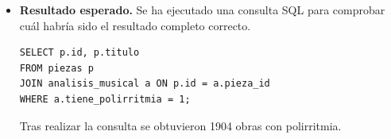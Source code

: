 \begin{itemize}
*   **IE-2019-D-HLS-010** (Compás: 4/4, Tonalidad: G major, BPM: 128)
*   **IE-2019-D-HLS-011** (Compás: 4/4, Tonalidad: G major, BPM: 128)
*   **IE-2019-D-HLS-015** (Compás: 3/4, Tonalidad: A minor)
*   **IE-2019-D-HLS-018** (Compás: 4/4, Tonalidad: G major, BPM: 70)
*   **IE-2019-D-HLS-019** (Compás: 3/8, Tonalidad: G major)
*   **IE-2019-D-HLS-021** (Compás: 4/4, Tonalidad: E minor, BPM: 167)
*   **IE-2019-D-HLS-031** (Compás: 4/4, Tonalidad: G major, BPM: 115)
*   **IE-2019-D-HLS-032** (Compás: 4/4, Tonalidad: G major, BPM: 54)
*   **IE-2019-D-HLS-057** (Compás: 4/4, Tonalidad: G major, BPM: 128)
*   **El reloj** (Autor: José Miguel Hernández Jaramillo, Compás: 2/4, Tonalidad: G major)"
\item \textbf{Resultado esperado.} Se ha ejecutado una consulta SQL para comprobar cuál habría sido el resultado completo correcto.
    \begin{verbatim}
SELECT p.id, p.titulo
FROM piezas p
JOIN analisis_musical a ON p.id = a.pieza_id
WHERE a.tiene_polirritmia = 1;
    \end{verbatim}    
    Tras realizar la consulta se obtuvieron 1904 obras con polirritmia.

\end{itemize}


